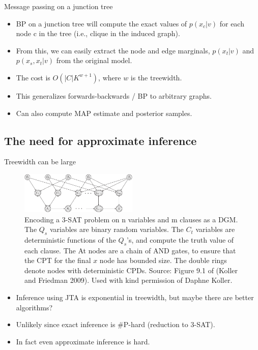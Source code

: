 \documentclass[10pt,mathserif]{beamer}
\begin{document}
\begin{frame}{Message passing on a junction tree}
\begin{itemize}
    \item BP on a junction tree will compute the exact values of $p(x_c|v)$ for each node c in the tree (i.e., clique in the induced graph).
    \item From this, we can easily extract the node and edge marginals, $p(x_t|v)$ and $p(x_s,x_t|v)$ from the original model.
    \item The cost is $O(|C|K^{w+1})$, where $w$ is the treewidth.
    \item This generalizes forwards-backwards / BP to arbitrary graphs.
    \item Can also compute MAP estimate and posterior samples.
\end{itemize}
\end{frame}

\subsection{The need for approximate inference}
\begin{frame}{Treewidth can be large}
\begin{figure}[h]
\centering     %
\includegraphics[width=0.5\textwidth]{koller-9-1}
\caption{Encoding a 3-SAT problem on n variables and m clauses as a DGM. The $Q_s$ variables are binary random variables. The $C_t$ variables are deterministic functions of the $Q_s$'s, and compute the truth value of each clause. The At nodes are a chain of AND gates, to ensure that the CPT for the final $x$ node has bounded size. The double rings denote nodes with deterministic CPDs. Source: Figure 9.1 of (Koller and Friedman 2009). Used with kind permission of Daphne Koller.}
\end{figure}

 \begin{itemize}
    \item Inference using JTA is exponential in treewidth, but maybe there are better algorithms?
    \item Unlikely since exact inference is \#P-hard (reduction to 3-SAT).
    \item In fact even approximate inference is hard.
 \end{itemize}
 \end{frame}
\end{document}

